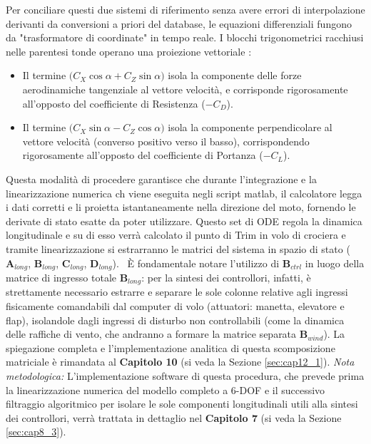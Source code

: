 Per conciliare questi due sistemi di riferimento senza avere errori di interpolazione derivanti da conversioni a priori del database, le equazioni differenziali fungono da "trasformatore di coordinate" in tempo reale. I blocchi trigonometrici racchiusi nelle parentesi tonde operano una proiezione vettoriale :
\begin{itemize}
	\item Il termine $\big(C_X \cos\alpha + C_Z \sin\alpha\big)$ isola la componente delle forze aerodinamiche tangenziale al vettore velocità, e corrisponde rigorosamente all'opposto del coefficiente di Resistenza ($-C_D$).
	\item Il termine $\big(C_X \sin\alpha - C_Z \cos\alpha\big)$ isola la componente perpendicolare al vettore velocità (converso positivo verso il basso), corrispondendo rigorosamente all'opposto del coefficiente di Portanza ($-C_L$).
\end{itemize}
Questa modalità di procedere garantisce che  durante l'integrazione e la linearizzazione numerica ch viene eseguita negli script matlab, il calcolatore legga i dati corretti e li proietta istantaneamente nella direzione del moto, fornendo le derivate di stato esatte da poter utilizzare.
Questo set di ODE regola la dinamica longitudinale e su di esso verrà calcolato il punto di Trim in volo di crociera e tramite linearizzazione si estrarranno le matrici del sistema in spazio di stato ($\mathbf{A}_{long}$, $\mathbf{B}_{long}$, $\mathbf{C}_{long}$, $\mathbf{D}_{long}$). 
\label{cap:5}
È fondamentale notare l'utilizzo di $\mathbf{B}_{ctrl}$ in luogo della matrice di ingresso totale $\mathbf{B}_{long}$: per la sintesi dei controllori, infatti, è strettamente necessario estrarre e separare le sole colonne relative agli ingressi fisicamente comandabili dal computer di volo (attuatori: manetta, elevatore e flap), isolandole dagli ingressi di disturbo non controllabili (come la dinamica delle raffiche di vento, che andranno a formare la matrice separata $\mathbf{B}_{wind}$). La spiegazione completa e l'implementazione analitica di questa scomposizione matriciale è rimandata al \textbf{Capitolo 10} (si veda la Sezione \ref{sec:cap12_1}). \textit{Nota metodologica:} L'implementazione software di questa procedura, che prevede prima la linearizzazione numerica del modello completo a 6-DOF e il successivo filtraggio algoritmico per isolare le sole componenti longitudinali utili alla sintesi dei controllori, verrà trattata in dettaglio nel \textbf{Capitolo 7} (si veda la Sezione \ref{sec:cap8_3}).

